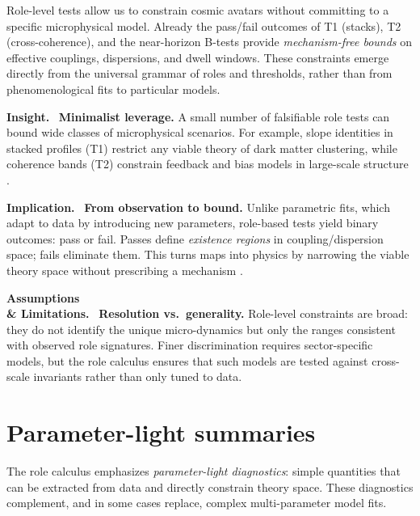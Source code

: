 \documentclass[12pt,a4paper,oneside]{scrreprt}
\newenvironment{insight}{\par\vspace{0.5em}\noindent\textbf{Insight.}\ }{\par\vspace{0.5em}}
\newenvironment{implication}{\par\vspace{0.5em}\noindent\textbf{Implication.}\ }{\par\vspace{0.5em}}
\newenvironment{limitation}{\par\vspace{0.5em}\noindent\textbf{Assumptions \\ \& Limitations.}\ }{\par\vspace{0.5em}}
\begin{document}
Role-level tests allow us to constrain cosmic avatars without 
committing to a specific microphysical model. 
Already the pass/fail outcomes of T1 (stacks), T2 (cross-coherence), 
and the near-horizon B-tests provide \emph{mechanism-free bounds} 
on effective couplings, dispersions, and dwell windows. 
These constraints emerge directly from the universal grammar of 
roles and thresholds, rather than from phenomenological fits 
to particular models. 

\begin{insight}
\textbf{Minimalist leverage.} 
A small number of falsifiable role tests can bound wide classes of 
microphysical scenarios. 
For example, slope identities in stacked profiles (T1) restrict 
any viable theory of dark matter clustering, while coherence bands (T2) 
constrain feedback and bias models in large-scale structure 
\citep{Peebles1980LSS,ColesLucchin2002}.
\end{insight}

\begin{implication}
\textbf{From observation to bound.} 
Unlike parametric fits, which adapt to data by introducing new parameters, 
role-based tests yield binary outcomes: pass or fail. 
Passes define \emph{existence regions} in coupling/dispersion space; 
fails eliminate them. 
This turns maps into physics by narrowing the viable theory space 
without prescribing a mechanism \citep{Planck2018Cosmo}.
\end{implication}

\begin{limitation}
\textbf{Resolution vs.\ generality.} 
Role-level constraints are broad: they do not identify the unique 
micro-dynamics but only the ranges consistent with observed role 
signatures. 
Finer discrimination requires sector-specific models, but the role 
calculus ensures that such models are tested against 
cross-scale invariants rather than only tuned to data.
\end{limitation}

\section{Parameter-light summaries}\label{sec:cosmos-summaries}

The role calculus emphasizes \emph{parameter-light diagnostics}: 
simple quantities that can be extracted from data and directly 
constrain theory space. 
These diagnostics complement, and in some cases replace, 
complex multi-parameter model fits. 
\end{document}

